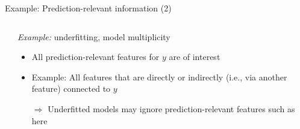 \documentclass[10pt,compress,t,notes=noshow, xcolor=table]{beamer}
\begin{document}
\begin{frame}{Example: Prediction-relevant information (2)}
\begin{columns}[T, totalwidth=\textwidth]
\begin{column}{0.52\textwidth}
{
}
  \end{column}
  \begin{column}{0.48\textwidth}
  \textit{Example:} underfitting, model multiplicity
  \pause
      \begin{itemize}
      \item All prediction-relevant features for $y$ are of interest
      \item Example: All features that are directly or indirectly (i.e., via another feature) connected to $y$ 
      \item[$\Rightarrow$] Underfitted models may ignore prediction-relevant features such as  here
  \end{itemize}
  \end{column}
\end{columns}
\end{frame}
\end{document}
